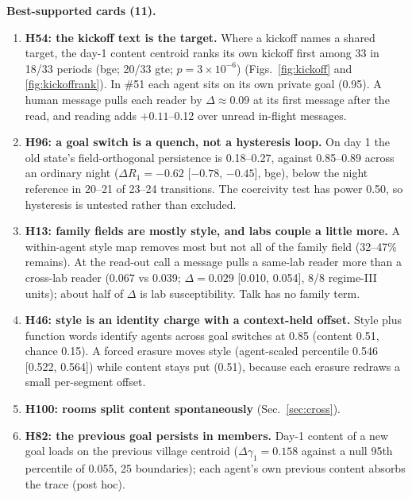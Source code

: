 \textbf{Best-supported cards (11).}
\begin{enumerate}
\item \textbf{H54: the kickoff text is the target.} Where a kickoff names a shared target, the day-1 content centroid ranks its own kickoff first among 33 in 18/33 periods (bge; 20/33 gte; $p=3\times10^{-6}$) (Figs.~\ref{fig:kickoff} and \ref{fig:kickoffrank}). In \#51 each agent sits on its own private goal (0.95). A human message pulls each reader by $\Delta\approx0.09$ at its first message after the read, and reading adds $+0.11$--0.12 over unread in-flight messages.
\item \textbf{H96: a goal switch is a quench, not a hysteresis loop.} On day 1 the old state's field-orthogonal persistence is 0.18--0.27, against 0.85--0.89 across an ordinary night ($\Delta R_1=-0.62$ [$-0.78$, $-0.45$], bge), below the night reference in 20--21 of 23--24 transitions. The coercivity test has power 0.50, so hysteresis is untested rather than excluded.
\item \textbf{H13: family fields are mostly style, and labs couple a little more.} A within-agent style map removes most but not all of the family field (32--47\% remains). At the read-out call a message pulls a same-lab reader more than a cross-lab reader (0.067 vs 0.039; $\Delta=0.029$ [0.010, 0.054], 8/8 regime-III units); about half of $\Delta$ is lab susceptibility. Talk has no family term.
\item \textbf{H46: style is an identity charge with a context-held offset.} Style plus function words identify agents across goal switches at 0.85 (content 0.51, chance 0.15). A forced erasure moves style (agent-scaled percentile 0.546 [0.522, 0.564]) while content stays put (0.51), because each erasure redraws a small per-segment offset.
\item \textbf{H100: rooms split content spontaneously} (Sec.~\ref{sec:cross}).
\item \textbf{H82: the previous goal persists in members.} Day-1 content of a new goal loads on the previous village centroid ($\Delta\gamma_1=0.158$ against a null 95th percentile of 0.055, 25 boundaries); each agent's own previous content absorbs the trace (post hoc).
\end{enumerate}

